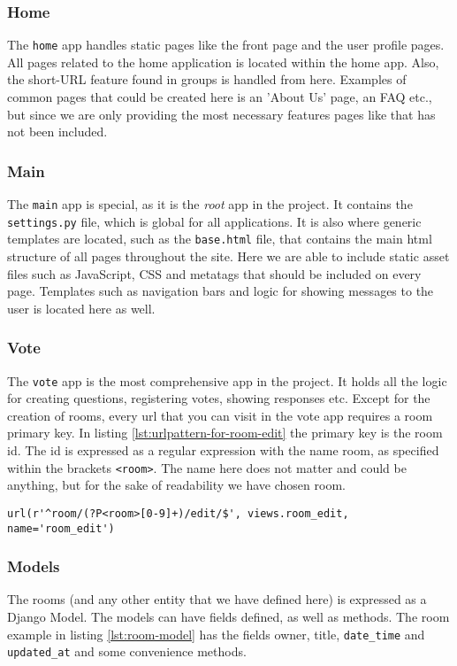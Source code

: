 \subsubsection*{Home} %
The \texttt{home} app handles static pages like the front page and the user profile pages.
All pages related to the home application is located within the home app. Also, the short-URL feature found in groups is handled from here. Examples of common pages that could be created here is an 'About Us' page, an FAQ etc., but since we are only providing the most necessary features pages like that has not been included.

\subsubsection*{Main}
The \texttt{main} app is special, as it is the \emph{root} app in the project. It contains the \texttt{settings.py} file, which is global for all applications. It is also where generic templates are located, such as the \texttt{base.html} file, that contains the main html structure of all pages throughout the site. Here we are able to include static asset files such as JavaScript, CSS and metatags that should be included on every page. Templates such as navigation bars and logic for showing messages to the user is located here as well.

\subsubsection*{Vote}
The \texttt{vote} app is the most comprehensive app in the project. It holds all the logic for creating questions, registering votes, showing responses etc. Except for the creation of rooms, every url that you can visit in the vote app requires a room primary key. In listing \ref{lst:urlpattern-for-room-edit} the primary key is the room id. The id is expressed as a regular expression with the name room, as specified within the brackets \texttt{<room>}. The name here does not matter and could be anything, but for the sake of readability we have chosen room.

\begin{lstlisting}[caption=URL Pattern for Room Edit, label=lst:urlpattern-for-room-edit]
url(r'^room/(?P<room>[0-9]+)/edit/$', views.room_edit, name='room_edit')
\end{lstlisting}

\subsubsection*{Models}
The rooms (and any other entity that we have defined here) is expressed as a Django Model.  
The models can have fields defined, as well as methods. The room example in listing \ref{lst:room-model} has the fields owner, title, \texttt{date\_time} and \texttt{updated\_at} and some convenience methods.


